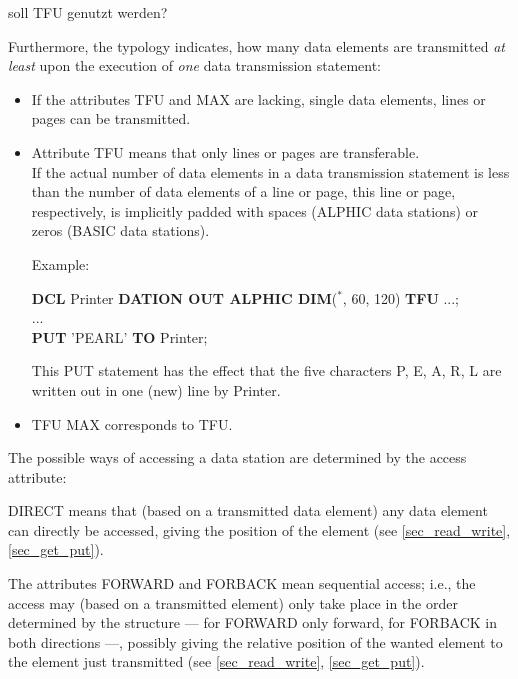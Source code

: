 \begin{discuss}
soll TFU genutzt werden?  


Furthermore, the typology indicates, how many data elements are
transmitted {\em at least} upon the execution of {\em one} data
transmission statement:
\begin{itemize}
\item If the attributes TFU and MAX are lacking, single data elements,
lines or pages can be transmitted.
\item Attribute TFU means that only lines or pages are transferable.\\
If the actual number of data elements in a data transmission statement
is less than the number of data elements of a line or page, this line or
page, respectively, is implicitly padded with spaces (ALPHIC data
stations) or zeros (BASIC data stations).

Example:

{\bf DCL} Printer {\bf DATION OUT ALPHIC DIM}($^*$, 60, 120) {\bf TFU} ...;\\
... \\
{\bf PUT} 'PEARL' {\bf TO} Printer;

This PUT statement has the effect that the five characters P, E, A, R,
L are written out in one (new) line by Printer.
\item TFU MAX corresponds to TFU.
\end{itemize}
\end{discuss}

The possible ways of accessing a data station are determined by the
access attribute:



DIRECT means that (based on a transmitted data element) any data element
can directly be accessed, giving the position of the element
(see \ref{sec_read_write}, \ref{sec_get_put}).

The attributes FORWARD and FORBACK mean sequential access; i.e., the
access may (based on a transmitted element) only take place in the order
determined by the structure --- for FORWARD only forward, for FORBACK in
both directions ---, possibly giving the relative position of the wanted
element to the element just transmitted 
(see \ref{sec_read_write}, \ref{sec_get_put}).

